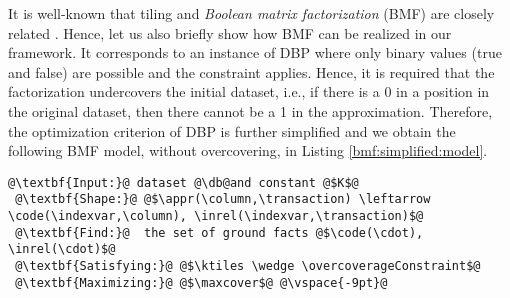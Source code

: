 
It is well-known that tiling and {\em Boolean matrix factorization} (BMF) are closely related \parencite{conf/icdm/Miettinen12}. Hence, let us also briefly show how BMF can be realized in our framework.  It corresponds to an instance of DBP where only binary values (true and false) are possible and the \overcoverageConstraint constraint applies. Hence, it is required that the factorization undercovers the initial dataset, i.e., if there is a 0 in a position in the original dataset, then there cannot be a 1 in the approximation.  Therefore, the optimization criterion of DBP is further simplified and we obtain the following BMF model, without overcovering, in Listing \ref{bmf:simplified:model}.
\begin{lstlisting}[style=model, label=bmf:simplified:model, caption=BMF without overcovering]
 @\textbf{Input:}@ dataset @\db@and constant @$K$@
 @\textbf{Shape:}@ @$\appr(\column,\transaction) \leftarrow \code(\indexvar,\column), \inrel(\indexvar,\transaction)$@
 @\textbf{Find:}@  the set of ground facts @$\code(\cdot), \inrel(\cdot)$@
 @\textbf{Satisfying:}@ @$\ktiles \wedge \overcoverageConstraint$@
 @\textbf{Maximizing:}@ @$\maxcover$@ @\vspace{-9pt}@
 \end{lstlisting}


